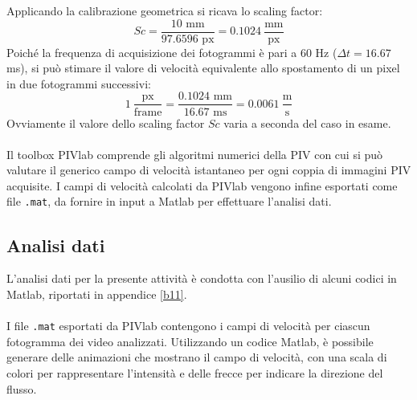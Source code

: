\noindent Applicando la calibrazione geometrica si ricava lo scaling factor:
\begin{equation*}
    Sc = \frac{10\text{ mm}}{97.6596\text{ px}} = 0.1024\ \frac{\text{mm}}{\text{px}}
\end{equation*}
Poiché la frequenza di acquisizione dei fotogrammi è pari a 60 Hz ($\Delta t = 16.67$ ms), si può stimare il valore di velocità equivalente allo spostamento di un pixel in due fotogrammi successivi:
\begin{equation*}
    1\   \frac{\text{px}}{\text{frame}} = \frac{0.1024 \text{ mm}}{16.67 \text{ ms}} = 0.0061\ \frac{\text{m}}{\text{s}}
\end{equation*}
Ovviamente il valore dello scaling factor $Sc$ varia a seconda del caso in esame.\\\\
Il toolbox PIVlab comprende gli algoritmi numerici della PIV con cui si può valutare il generico campo di velocità istantaneo per ogni coppia di immagini PIV acquisite. I campi di velocità calcolati da PIVlab vengono infine esportati come file \texttt{.mat}, da fornire in input a Matlab per effettuare l'analisi dati.

\newpage
\subsection{Analisi dati}
L'analisi dati per la presente attività è condotta con l'ausilio di alcuni codici in Matlab, riportati in appendice \ref{b11}.\\\\
I file \texttt{.mat} esportati da PIVlab contengono i campi di velocità per ciascun fotogramma dei video analizzati. Utilizzando un codice Matlab, è possibile generare delle animazioni che mostrano il campo di velocità, con una scala di colori per rappresentare l'intensità e delle frecce per indicare la direzione del flusso.

